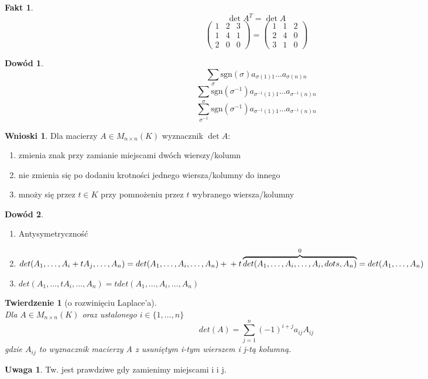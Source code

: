 \documentclass[12pt,a4paper]{article}
\theoremstyle{plain}
\newtheorem{tw}{Twierdzenie}[section]
\theoremstyle{definition}
\newtheorem{ft}{Fakt}[section]
\theoremstyle{definition}
\theoremstyle{definition}
\theoremstyle{definition}
\newtheorem*{dd}{Dowód}
\theoremstyle{definition}
\theoremstyle{definition}
\theoremstyle{definition}
\theoremstyle{definition}
\newtheorem*{uw}{Uwaga}
\theoremstyle{definition}
\newtheorem*{wn}{Wnioski}
\begin{document}
\begin{ft}
    \[\det A^T = \det A\]
  \[\begin{pmatrix}1&2&3\\1&4&1\\2&0&0\end{pmatrix}
    =\begin{pmatrix}1&1&2\\2&4&0\\3&1&0\end{pmatrix}\]
\end{ft}
\begin{dd}
    \[\sum_\sigma\mathrm{sgn}(\sigma)a_{\sigma(1)1}...a_{\sigma(n)n}\]
    \[\sum_\sigma\mathrm{sgn}(\sigma^{-1})a_{\sigma^{-1}(1)1}...a_{\sigma^{-1}(n)n}\]
    \[\sum_{\sigma^{-1}}\mathrm{sgn}(\sigma^{-1})a_{\sigma^{-1}(1)1}...a_{\sigma^{-1}(n)n}\]
\end{dd}
\newpage
\begin{wn}
    Dla macierzy $A \in M_{n \times n}(K)$ wyznacznik $\det A$:
    \begin{enumerate}[{(}1{)}]
        \item zmienia znak przy zamianie miejscami dwóch wierszy/kolumn
        \item nie zmienia się po dodaniu krotności jednego wiersza/kolumny do innego
        \item mnoży się przez $t \in K$ przy pomnożeniu przez $t$ wybranego
          wiersza/kolumny
    \end{enumerate}
\end{wn}

\begin{dd} \hfill
    \begin{enumerate}[{(}1{)}]
        \item Antysymetryczność
        \item $det(A_1,\dots,A_i+tA_j,\dots,A_n) = det(A_1,\dots,A_i,\dots,A_n) + \\ + t \overbrace{det(A_1,\dots,A_i,\dots,A_i
        ,dots,A_n)}^0 = det(A_1,\dots,A_n)$
        \item $det(A_1,\dots,tA_i,\dots,A_n) = t det(A_1,\dots,A_i,\dots,A_n)$
    \end{enumerate}
\end{dd}

\begin{tw}[o rozwinięciu Laplace'a] ~\\
    Dla $A \in M_{n \times n} (K) $ oraz ustalonego $i \in \{1,\dots,n\}$ 
        $$det(A) = \sum_{j=1}^n (-1)^{i+j} a_{ij} A_{ij}$$
        gdzie $A_{ij}$ to wyznacznik macierzy A z usuniętym i-tym wierszem i j-tą kolumną. 
        \end{tw}
\begin{uw}
    Tw. jest prawdziwe gdy zamienimy miejscami i i j.
\end{uw}
\end{document}
